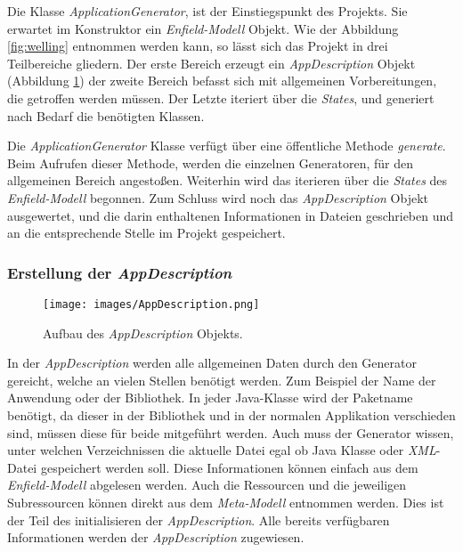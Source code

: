 Die Klasse \textit{ApplicationGenerator}, ist der Einstiegspunkt des Projekts. Sie erwartet im Konstruktor ein \textit{Enfield-Modell} Objekt. Wie der Abbildung \ref{fig:welling} entnommen werden kann, so lässt sich das Projekt in drei Teilbereiche gliedern. Der erste Bereich erzeugt ein \textit{AppDescription} Objekt (Abbildung \ref{fig:appDescription}) der zweite Bereich befasst sich mit allgemeinen Vorbereitungen, die getroffen werden müssen. Der Letzte iteriert über die \textit{States}, und generiert nach Bedarf die benötigten Klassen.

Die \textit{ApplicationGenerator} Klasse verfügt über eine öffentliche Methode \textit{generate}. Beim Aufrufen dieser Methode, werden die einzelnen Generatoren, für den allgemeinen Bereich angestoßen. Weiterhin wird das iterieren über die \textit{States} des \textit{Enfield-Modell} begonnen. Zum Schluss wird noch das \textit{AppDescription} Objekt ausgewertet, und die darin enthaltenen Informationen in Dateien geschrieben und an die entsprechende Stelle im Projekt gespeichert.

\subsubsection{Erstellung der \textit{AppDescription}}

\begin{figure}[H]
	\begin{center}
		\texttt{[image: images/AppDescription.png]}
		\caption{Aufbau des \textit{AppDescription} Objekts.}
		\label{fig:appDescription}
	\end{center}
\end{figure}

In der \textit{AppDescription} werden alle allgemeinen Daten durch den Generator gereicht, welche an vielen Stellen benötigt werden. 
Zum Beispiel der Name der Anwendung oder der Bibliothek. In jeder Java-Klasse wird der Paketname benötigt, da dieser in der Bibliothek und in der normalen Applikation verschieden sind, müssen diese für beide mitgeführt werden. Auch muss der Generator wissen, unter welchen Verzeichnissen die aktuelle Datei egal ob Java Klasse oder \textit{XML}-Datei gespeichert werden soll. 
Diese Informationen können einfach aus dem \textit{Enfield-Modell} abgelesen werden. Auch die Ressourcen und die jeweiligen Subressourcen können direkt aus dem \textit{Meta-Modell} entnommen werden.  Dies ist der Teil des initialisieren der \textit{AppDescription}. Alle bereits verfügbaren Informationen werden der \textit{AppDescription} zugewiesen. 

